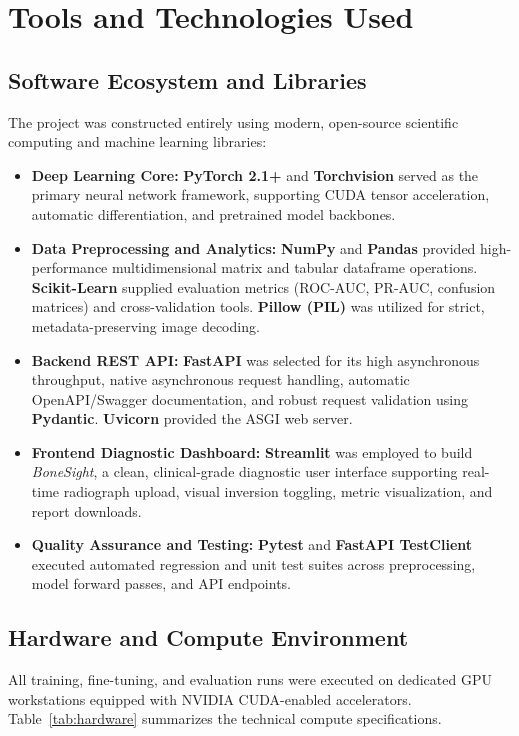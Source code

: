 \documentclass[12pt, a4paper]{report}
\begin{document}
\newpage
\chapter{Tools and Technologies Used}

\section{Software Ecosystem and Libraries}
The project was constructed entirely using modern, open-source scientific computing and machine learning libraries:
\begin{itemize}[leftmargin=*]
    \item \textbf{Deep Learning Core:} \textbf{PyTorch 2.1+} and \textbf{Torchvision} served as the primary neural network framework, supporting CUDA tensor acceleration, automatic differentiation, and pretrained model backbones.
    \item \textbf{Data Preprocessing and Analytics:} \textbf{NumPy} and \textbf{Pandas} provided high-performance multidimensional matrix and tabular dataframe operations. \textbf{Scikit-Learn} supplied evaluation metrics (ROC-AUC, PR-AUC, confusion matrices) and cross-validation tools. \textbf{Pillow (PIL)} was utilized for strict, metadata-preserving image decoding.
    \item \textbf{Backend REST API:} \textbf{FastAPI} was selected for its high asynchronous throughput, native asynchronous request handling, automatic OpenAPI/Swagger documentation, and robust request validation using \textbf{Pydantic}. \textbf{Uvicorn} provided the ASGI web server.
    \item \textbf{Frontend Diagnostic Dashboard:} \textbf{Streamlit} was employed to build \textit{BoneSight}, a clean, clinical-grade diagnostic user interface supporting real-time radiograph upload, visual inversion toggling, metric visualization, and report downloads.
    \item \textbf{Quality Assurance and Testing:} \textbf{Pytest} and \textbf{FastAPI TestClient} executed automated regression and unit test suites across preprocessing, model forward passes, and API endpoints.
\end{itemize}

\section{Hardware and Compute Environment}
All training, fine-tuning, and evaluation runs were executed on dedicated GPU workstations equipped with NVIDIA CUDA-enabled accelerators. Table~\ref{tab:hardware} summarizes the technical compute specifications.
\end{document}
